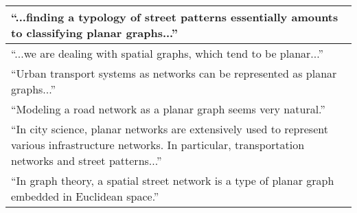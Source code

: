 \begin{tabular}{ | p{\textwidth} | }
\enquote{...finding a typology of street patterns essentially amounts to classifying planar graphs...} \citep[p.~2]{louf_typology_2014} \\ \hline

\enquote{...we are dealing with spatial graphs, which tend to be planar...} \citep[p.~2191]{zhong_detecting_2014} \\ \hline

\enquote{Urban transport systems as networks can be represented as planar graphs...} \citep[p.~2]{wang_resilience_2015} \\ \hline

\enquote{Modeling a road network as a planar graph seems very natural.} \citep[p.~42]{aldous_routed_2016} \\ \hline

\enquote{In city science, planar networks are extensively used to represent various infrastructure networks. In particular, transportation networks and street patterns...} \citep[p.~257]{barthelemy_paths_2017} \\ \hline

\enquote{In graph theory, a spatial street network is a type of planar graph embedded in Euclidean space.} \citep[p.~168]{law_defining_2017} \\ \hline

\end{tabular}
